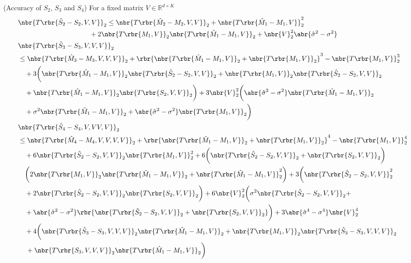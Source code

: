 \documentclass[twoside,11pt]{article}
\begin{document}
{%
\begin{lemma}{(Accuracy of $S_2$, $S_3$ and $S_4$)}
For a fixed matrix $V \in \mathbb{R}^{d \times K}$
  \label{lem:spectralbounds}
  \begin{align}
    &\nbr{T\rbr{\hat{S}_2- S_2,V,V}}_2 \leq \nbr{T\rbr{\hat{M}_2 - M_2,V,V}}_2 + \nbr{T\rbr{ \hat{M}_1 - M_1,V} }_2^2\nonumber\\
    &\,\,\,\,\,\,\,\,\,\,\,\,\,\,\,\,\,\,\,\,\,\,\,\,\,\,\,\,\,\,\,\,\,\,\,\,\,\,\,\,\,\,\,\,\,\,\,\,\,\,\,\,\,\,\,\,\,\,\,\,\,\,\,+ 2 \nbr{T\rbr{M_1,V}}_2\nbr{T\rbr{ \hat{M}_1 - M_1 ,V} }_2+ \nbr{V}_2^2 \abr{\hat{\sigma}^2 - \sigma^2}\\
    &\nbr{T\rbr{\hat{S}_3-S_3,V,V,V}}_2\nonumber \\
    &\leq \nbr{T\rbr{\hat{M}_3-M_3, V,V,V}}_2 + \rbr{ \nbr{T\rbr{\hat{M}_1-M_1,V}}_2 +  \nbr{T\rbr{M_1,V}}_2}^3- \nbr{T\rbr{M_1,V}}_2^3\nonumber\\
    &\,\,\,\,\,\,+ 3\bigg(\nbr{T\rbr{ \hat{M}_1-M_1 ,V  }}_2  \nbr{T\rbr{ \hat{S}_2-S_2 ,V,V  }}_2 +  \nbr{T\rbr{ M_1,V  }}_2  \nbr{T\rbr{ \hat{S}_2-S_2 ,V,V  }}_2 \nonumber\\
    &\,\,\,\,\,\,+ \nbr{T\rbr{ \hat{M}_1-M_1 ,V  }}_2  \nbr{T\rbr{ S_2 ,V,V  }}_2 \bigg) +3\nbr{V}_2^2 \bigg( \abr{\hat{\sigma}^2-\sigma^2} \nbr{T\rbr{\hat{M}_1-M_1,V}}_2\nonumber\\
    &\,\,\,\,\,\, + \sigma^2\nbr{T\rbr{\hat{M}_1-M_1,V}}_2+ \abr{\hat{\sigma}^2-\sigma^2} \nbr{T\rbr{M_1,V}}_2  \bigg)\\
    &\nbr{T\rbr{\hat{S}_4- S_4,V,VV,V}}_2 \nonumber\\
    &\leq  \nbr{T\rbr{\hat{M}_4-M_4,V, V,V,V}}_2+ \rbr{ \nbr{T\rbr{\hat{M}_1-M_1,V}}_2 +  \nbr{T\rbr{M_1,V}}_2}^4 - \nbr{T\rbr{M_1,V}}_2^4\nonumber\\
    &\,\,\,\,\,\,+ 6\nbr{T\rbr{\hat{S}_2-S_2,V,V}}_2 \nbr{T\rbr{M_1,V}}_2^2 + 6 \bigg( \nbr{T\rbr{\hat{S}_2-S_2,V,V}}_2+\nbr{T\rbr{S_2,V,V}}_2 \bigg)\nonumber\\
    &\,\,\,\,\,\, \bigg( 2\nbr{T\rbr{M_1,V}}_2\nbr{T\rbr{\hat{M}_1-M_1,V}}_2+\nbr{T\rbr{\hat{M}_1-M_1,V}}_2^2 \bigg) 
+ 3\bigg(\nbr{T\rbr{\hat{S}_2-S_2,V,V}}_2^2\nonumber\\
    &\,\,\,\,\,\,+2\nbr{T\rbr{\hat{S}_2-S_2,V,V}}_2\nbr{T\rbr{S_2,V,V}}_2 \bigg) + 6\nbr{V}_2^2 \bigg(
\sigma^2\nbr{T\rbr{\hat{S}_2-S_2,V,V}}_2+\nonumber\\
    &\,\,\,\,\,\, +\abr{\hat{\sigma}^2-\sigma^2} \rbr{\nbr{T\rbr{\hat{S}_2-S_2,V,V}}_2+\nbr{T\rbr{S_2,V,V}}_2 } \bigg)+3 \abr{\hat{\sigma}^4 -  \sigma^4}\nbr{V}_2^4 \nonumber\\
    &\,\,\,\,\,\,+4 \bigg( \nbr{T\rbr{\hat{S}_3-S_3,V,V,V}}_2  \nbr{T\rbr{\hat{M}_1-M_1,V}}_2 +\nbr{T\rbr{M_1,V}}_2 \nbr{T\rbr{\hat{S}_3-S_3,V,V,V}}_2  \nonumber\\
    &\,\,\,\,\,\,\,+  \nbr{T\rbr{S_3,V,V,V}}_2  \nbr{T\rbr{\hat{M}_1-M_1,V}}_2
    \bigg) 
  \end{align}
\end{lemma}

}
\end{document}
